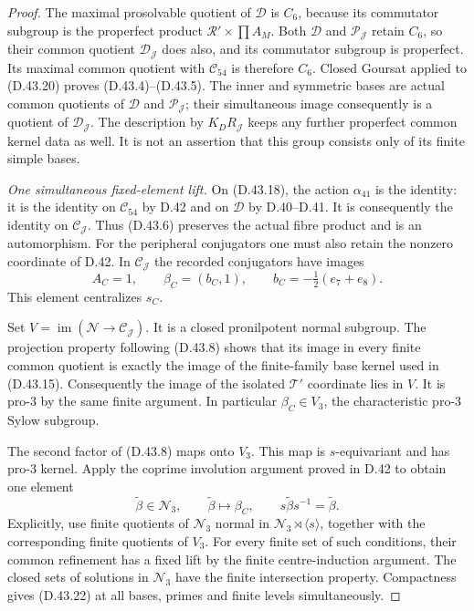 \begin{proof}
The maximal
prosolvable quotient
of $\mathcal D$
is $C_6$, because
its commutator
subgroup is the
properfect product
$\mathcal R'\times
\prod A_M$.
Both $\mathcal D$
and $\mathcal P_{\mathscr J}$
retain $C_6$,
so their common
quotient
$\mathcal D_{\mathscr J}$
does also, and
its commutator
subgroup is
properfect.
Its maximal common
quotient with
$\mathcal C_{54}$
is therefore
$C_6$.
Closed Goursat
applied to
(D.43.20) proves
(D.43.4)--(D.43.5).
The inner and
symmetric bases
are actual common
quotients of
$\mathcal D$ and
$\mathcal P_{\mathscr J}$;
their simultaneous
image consequently
is a quotient of
$\mathcal D_{\mathscr J}$.
The description
by $K_D R_{\mathscr J}$
keeps any further
properfect common
kernel data as well.
It is not an
assertion that this
group consists
only of its finite
simple bases.

\emph{One simultaneous fixed-element lift.}
On (D.43.18), the
action $\alpha_{41}$
is the identity:
it is the identity
on $\mathcal C_{54}$
by D.42 and on
$\mathcal D$ by
D.40--D.41.
It is consequently
the identity on
$\mathcal C_{\mathscr J}$.
Thus (D.43.6)
preserves the
actual fibre product
and is an
automorphism.
For the peripheral
conjugators one
must also retain
the nonzero
coordinate of
D.42. In
$\mathcal C_{\mathscr J}$
the recorded
conjugators have
images
\[
          A_C=1,\qquad
          \beta_C=(b_C,1),\qquad
          b_C=-\tfrac12(e_7+e_8).                     \tag{D.43.21}
\]
This element
centralizes $s_C$.

Set $V=\operatorname{im}(\mathcal N
\to\mathcal C_{\mathscr J})$.
It is a closed
pronilpotent
normal subgroup.
The projection
property following
(D.43.8) shows
that its image
in every finite
common quotient
is exactly the
image of the
finite-family
base kernel
used in
(D.43.15).
Consequently
the image of
the isolated
$\mathcal T'$
coordinate lies
in $V$.
It is pro-$3$
by the same
finite argument.
In particular
$\beta_C\in V_3$,
the characteristic
pro-$3$ Sylow
subgroup.

The second factor
of (D.43.8)
maps onto $V_3$.
This map is
$s$-equivariant
and has pro-$3$
kernel. Apply
the coprime
involution argument
proved in D.42
to obtain one
element
\[
 \widetilde\beta\in\mathcal N_3,\qquad
 \widetilde\beta\longmapsto\beta_C,\qquad
 s\widetilde\beta s^{-1}=\widetilde\beta.
                                                               \tag{D.43.22}
\]
Explicitly, use
finite quotients
of $\mathcal N_3$
normal in
$\mathcal N_3\rtimes\langle s\rangle$,
together with the
corresponding finite
quotients of $V_3$.
For every finite
set of such
conditions, their
common refinement
has a fixed lift
by the finite
centre-induction
argument. The
closed sets of
solutions in
$\mathcal N_3$
have the finite
intersection
property.
Compactness gives
(D.43.22) at
all bases, primes
and finite levels
simultaneously.


\end{proof}
